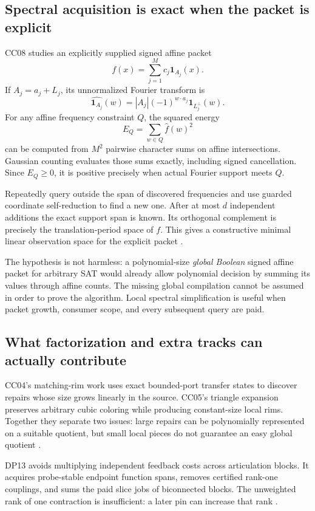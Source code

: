 \documentclass[11pt,letterpaper]{article}
\theoremstyle{definition}
\begin{document}
\subsection{Spectral acquisition is exact when the packet is explicit}

CC08 studies an explicitly supplied signed affine packet
\[
f(x)=\sum_{j=1}^M c_j\mathbf1_{A_j}(x).
\]
If $A_j=a_j+L_j$, its unnormalized Fourier transform is
\[
\widehat{\mathbf1_{A_j}}(w)=|A_j|(-1)^{w\cdot a_j}\mathbf1_{L_j^\perp}(w).
\]
For any affine frequency constraint $Q$, the squared energy
\[
E_Q=\sum_{w\in Q}\widehat f(w)^2
\]
can be computed from $M^2$ pairwise character sums on affine intersections. Gaussian counting evaluates those sums exactly, including signed cancellation. Since $E_Q\ge0$, it is positive precisely when actual Fourier support meets $Q$.

Repeatedly query outside the span of discovered frequencies and use guarded coordinate self-reduction to find a new one. After at most $d$ independent additions the exact support span is known. Its orthogonal complement is precisely the translation-period space of $f$. This gives a constructive minimal linear observation space for the explicit packet \cite{cc08}.

The hypothesis is not harmless: a polynomial-size \emph{global Boolean} signed affine packet for arbitrary SAT would already allow polynomial decision by summing its values through affine counts. The missing global compilation cannot be assumed in order to prove the algorithm. Local spectral simplification is useful when packet growth, consumer scope, and every subsequent query are paid.

\subsection{What factorization and extra tracks can actually contribute}

CC04's matching-rim work uses exact bounded-port transfer states to discover repairs whose size grows linearly in the source. CC05's triangle expansion preserves arbitrary cubic coloring while producing constant-size local rims. Together they separate two issues: large repairs can be polynomially represented on a suitable quotient, but small local pieces do not guarantee an easy global quotient \cite{cc04,cc05}.

DP13 avoids multiplying independent feedback costs across articulation blocks. It acquires probe-stable endpoint function spans, removes certified rank-one couplings, and sums the paid slice jobs of biconnected blocks. The unweighted rank of one contraction is insufficient: a later pin can increase that rank \cite{dp13}.
\end{document}
